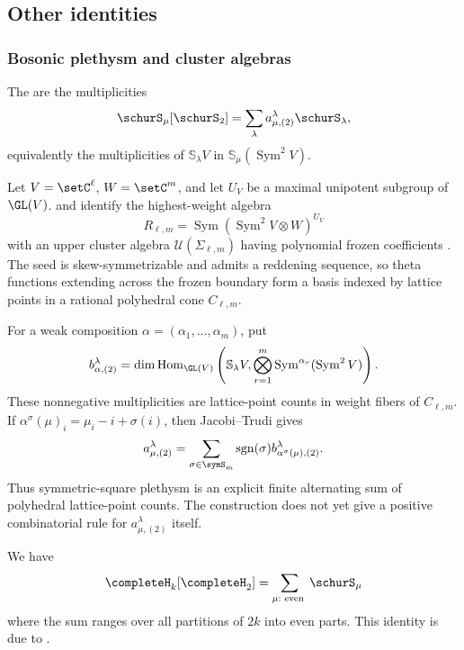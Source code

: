 \subsection[plethysmOther]{Other identities}

\subsubsection[bosonicPlethysmCluster]{Bosonic plethysm and cluster algebras}

The  are the multiplicities
\[
  \schurS_\mu[\schurS_2]
  =
  \sum_\lambda a^\lambda_{\mu,(2)}\schurS_\lambda,
\]
equivalently the multiplicities of
\(\mathbb{S}_\lambda V\) in
\(\mathbb{S}_\mu(\operatorname{Sym}^2V)\).

Let \(V=\setC^\ell\), \(W=\setC^m\), and let \(U_V\) be a maximal unipotent
subgroup of \(\GL(V)\).   and  identify the
highest-weight algebra
\[
  R_{\ell,m}
  =
  \operatorname{Sym}(\operatorname{Sym}^2V\otimes W)^{U_V}
\]
with an upper cluster algebra \(\mathcal{U}(\Sigma_{\ell,m})\) having
polynomial frozen coefficients \cite{FanFei2026x}.  The seed is
skew-symmetrizable and admits a reddening sequence, so theta functions
extending across the frozen boundary form a basis indexed by lattice points
in a rational polyhedral cone \(C_{\ell,m}\).

For a weak composition \(\alpha=(\alpha_1,\dotsc,\alpha_m)\), put
\[
  b^\lambda_{\alpha,(2)}
  =
  \dim\operatorname{Hom}_{\GL(V)}
  \left(
    \mathbb{S}_\lambda V,
    \bigotimes_{r=1}^m
    \operatorname{Sym}^{\alpha_r}(\operatorname{Sym}^2V)
  \right).
\]
These nonnegative multiplicities are lattice-point counts in weight fibers of
\(C_{\ell,m}\).  If
\(\alpha^\sigma(\mu)_i=\mu_i-i+\sigma(i)\), then Jacobi--Trudi gives
\[
  a^\lambda_{\mu,(2)}
  =
  \sum_{\sigma\in\symS_m}
  \operatorname{sgn}(\sigma)
  b^\lambda_{\alpha^\sigma(\mu),(2)}.
\]
Thus symmetric-square plethysm is an explicit finite alternating sum of
polyhedral lattice-point counts.  The construction does not yet give a
positive combinatorial rule for \(a^\lambda_{\mu,(2)}\) itself.

\begin{proposition}
We have
\[
\completeH_k[\completeH_2] = \sum_{\mu : \text{ even }} \schurS_{\mu}
\]
where the sum ranges over all partitions of $2k$ into even parts.
This identity is due to .
\end{proposition}


